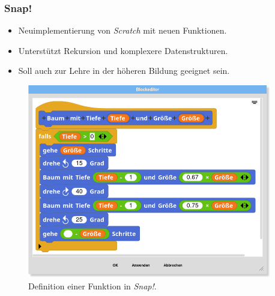 \begin{frame}
  \frametitle{Snap!}

  \begin{minipage}{.6\textwidth}
    \begin{itemize}
      \item Neuimplementierung von \textit{Scratch} mit neuen Funktionen.
      \item Unterstützt Rekursion und komplexere Datenstrukturen.
      \item Soll auch zur Lehre in der höheren Bildung geeignet sein.
    \end{itemize}
  \end{minipage}%
  \begin{minipage}{.4\textwidth}
    \begin{figure}
      \begin{center}
        \includegraphics[width=0.95\textwidth]{assets/snap-edit.png}
      \end{center}
      \caption{Definition einer Funktion in \textit{Snap!}.}
    \end{figure}
  \end{minipage}


\end{frame}

